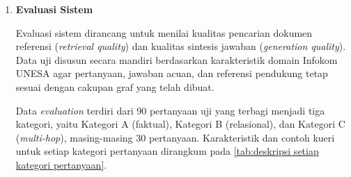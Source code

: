 \begin{enumerate}[label=\textbf{\arabic*.}, leftmargin=*, itemsep=10pt, listparindent=0.75cm]
\begin{enumerate}[label=\textbf{\alph*.}, leftmargin=*, itemsep=5pt, listparindent=0.75cm]
              \item \textbf{\textit{LLM Generation} \& \textit{Response}}

                    Tahap akhir dari proses \textit{retrieval} adalah sintesis jawaban menggunakan model bahasa besar (\textit{LLM}). Pada tahap ini, konteks lokal dan konteks global yang telah disiapkan digabungkan menjadi satu \textit{prompt} terstruktur bersama dengan kueri asli pengguna. \textit{Prompt} dirancang sedemikian rupa agar \textit{LLM} dapat membedakan antara bukti dari graf (entitas dan relasi) dengan bukti dari dokumen teks (\textit{paper chunks}), sehingga jawaban yang dihasilkan dapat dilacak kembali ke sumber aslinya. Seluruh konteks yang dikirimkan dibatasi oleh anggaran token maksimum agar tidak melebihi kapasitas jendela konteks model. Jawaban akhir yang dihasilkan oleh \textit{LLM} kemudian ditampilkan kepada pengguna beserta bukti pendukung berupa tripel graf dan potongan dokumen yang digunakan selama proses generasi.
          \end{enumerate}

    \item \textbf{Evaluasi Sistem}
          \label{subsec:system-evaluation}

          Evaluasi sistem dirancang untuk menilai kualitas pencarian dokumen referensi (\textit{retrieval quality}) dan kualitas sintesis jawaban (\textit{generation quality}). Data uji disusun secara mandiri berdasarkan karakteristik domain Infokom UNESA agar pertanyaan, jawaban acuan, dan referensi pendukung tetap sesuai dengan cakupan graf yang telah dibuat.

          Data \textit{evaluation} terdiri dari 90 pertanyaan uji yang terbagi menjadi tiga kategori, yaitu Kategori A (faktual), Kategori B (relasional), dan Kategori C (\textit{multi-hop}), masing-masing 30 pertanyaan. Karakteristik dan contoh kueri untuk setiap kategori pertanyaan dirangkum pada \ref{tab:deskripsi setiap kategori pertanyaan}.


\end{enumerate}
